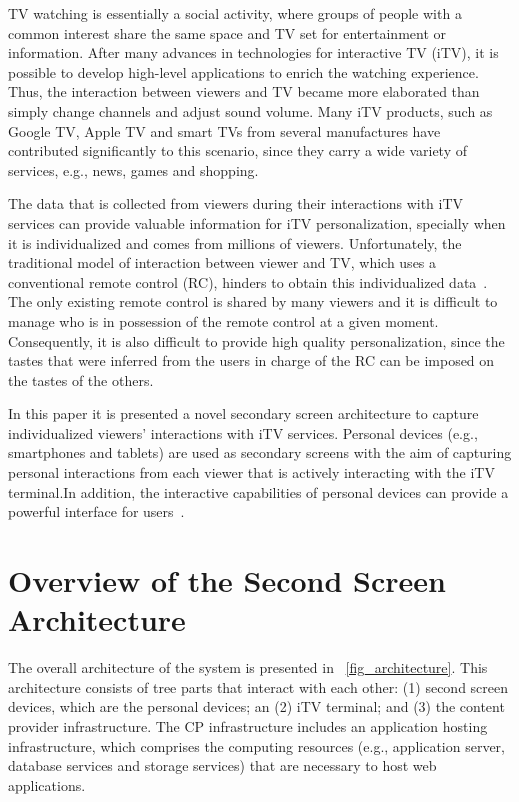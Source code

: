 \documentclass[journal]{IEEEtran}
\begin{document}
TV watching is essentially a social activity, where groups of people with a common interest share the same space and TV set for entertainment or information. After many advances in technologies for interactive TV (iTV), it is possible to develop high-level applications to enrich the watching experience. Thus, the interaction between viewers and TV became more elaborated than simply change channels and adjust sound volume. Many iTV products, such as Google TV, Apple TV and smart TVs from several manufactures have contributed significantly to this scenario, since they carry a wide variety of services, e.g., news, games and shopping.

The data that is collected from viewers during their interactions with iTV services can provide valuable information for iTV personalization, specially when it is individualized and comes from millions of viewers. Unfortunately, the traditional model of interaction between viewer and TV, which uses a conventional remote control (RC), hinders to obtain this individualized data~\cite{Cesar2008}. The only existing remote control is shared by many viewers and it is difficult to manage who is in possession of the remote control at a given moment. Consequently, it is also difficult to provide high quality personalization, since the tastes that were inferred from the users in charge of the RC can be imposed on the tastes of the others.

In this paper it is presented a novel secondary screen architecture to capture individualized viewers' interactions with iTV services. Personal devices (e.g., smartphones and tablets) are used as secondary screens with the aim of capturing personal interactions from each viewer that is actively interacting with the iTV terminal.In addition, the interactive capabilities of personal devices can provide a powerful interface for users~\cite{Lee2013}.

\section{Overview of the Second Screen Architecture}

The overall architecture of the system is presented in \figurename~\ref{fig_architecture}. This architecture consists of tree parts that interact with each other: (1) second screen devices, which are the personal devices; an (2) iTV terminal; and (3) the content provider infrastructure. The CP infrastructure includes an application hosting infrastructure, which comprises the computing resources (e.g., application server, database services and storage services) that are necessary to host web applications. %
\end{document}
